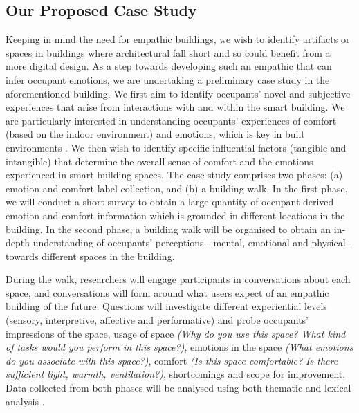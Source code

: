 \documentclass [sigconf, review, anonymous] {acmart}
\begin{document}
\subsection{Our Proposed Case Study} 
Keeping in mind the need for empathic buildings, we wish to identify artifacts or spaces in buildings where architectural  fall short and so could benefit from a more digital design. As a step towards developing such an empathic  that can infer occupant emotions, we are undertaking a preliminary case study in the aforementioned building. We first aim to identify occupants' novel and subjective experiences that arise from interactions with and within the smart building. We are particularly interested in understanding occupants' experiences of comfort (based on the indoor environment) and emotions, which is key in built environments \cite{alavi2017comfort}.  We then wish to identify specific influential factors (tangible and intangible) that determine the overall sense of comfort and the emotions experienced in smart building spaces. The case study comprises two phases: (a) emotion and comfort label collection, and (b) a building walk. In the first phase, we will conduct a short survey to obtain a large quantity of occupant derived emotion and comfort information which is grounded in different locations in the building. In the second phase, a building walk will be organised to obtain an in-depth understanding of occupants' perceptions - mental, emotional and physical - towards different spaces in the building.

During the walk, researchers will engage participants in conversations about each space, and conversations will form around what users expect of an empathic building of the future. Questions will investigate different experiential levels (sensory, interpretive, affective and performative) and probe occupants' impressions of the space, usage of space \textit{(Why do you use this space? What kind of tasks would you perform in this space?)}, emotions in the space \textit{(What emotions do you associate with this space?)}, comfort \textit{(Is this space comfortable? Is there sufficient light, warmth, ventilation?)}, shortcomings and scope for improvement. Data collected from both phases will be analysed using both thematic and lexical analysis \cite{braun2006using, xue2020mood}. 
\end{document}
